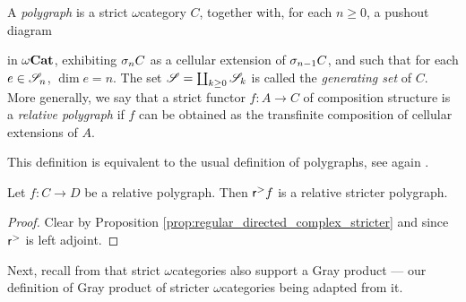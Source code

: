 \begin{dfn} [Polygraph]
    A \emph{polygraph} is a strict \( \omega \)\nbd category \( C \), together with, for each \( n \geq 0 \), a pushout diagram
    \begin{center}
    \end{center}
    in \( {\omega\mathbf{Cat}} \), exhibiting \( \sigma_{n}C \) as a cellular extension of \( \sigma_{n - 1}C \), and such that for each \( e \in \mathscr{S}_n \), \( \dim e = n \).
    The set \( \mathscr{S} = \coprod_{k \geq 0} \mathscr{S}_k \) is called the \emph{generating set} of \( C \).
    More generally, we say that a strict functor \( f \colon A \to C \) of composition structure is a \emph{relative polygraph} if \( f \) can be obtained as the transfinite composition of cellular extensions of \( A \).
\end{dfn}

\begin{rmk}
    This definition is equivalent to the usual definition of polygraphs, see again \cite[Comment 8.2.2]{hadzihasanovic2024combinatorics}.
\end{rmk}

\begin{lem} \label{lem:reflection_of_polygraphs_are_stricter_polygraphs}
    Let \( f \colon C \to D \) be a relative polygraph.
    Then \( \mathsf{r}^{>} f \) is a relative stricter polygraph.
\end{lem}
\begin{proof}
    Clear by Proposition \ref{prop:regular_directed_complex_stricter} and since \( \mathsf{r}^{>} \) is left adjoint.
\end{proof}

\noindent Next, recall from \cite[Appendice A]{ara2020joint} that strict \( \omega \)\nbd categories also support a Gray product --- our definition of Gray product of stricter \( \omega \)\nbd categories being adapted from it.

